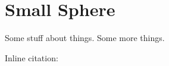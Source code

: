 \chapter{Small Sphere}
\label{SmallSphereChapter}

Some stuff about things.\cite{example-citation} Some more things. 

Inline citation: 

\blindtext
\blindtext
\blindtext
\blindtext
\blindtext
\blindtext
\blindtext
\blindtext
\blindtext